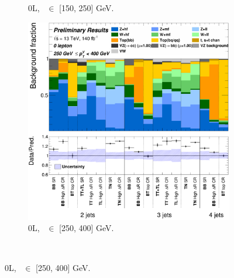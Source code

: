 \begin{figure}[h!]
{\begin{subfigure}[b]{0.38\textwidth}
            \caption{0L, \ptv\ $\in$ [150, 250] GeV.}
            \label{fig:backCom_0L_1}
        \end{subfigure}
        \begin{subfigure}[b]{0.38\textwidth}
            \centering
            \includegraphics[width=\textwidth]{Images/VH/Own_fit/backCom_uncPrefit/GlobalFit_unconditional__Prefit/C_SRCRs_L0_BMax400_BMin250.png}
            \caption{0L, \ptv\ $\in$ [250, 400] GeV.}
            \label{fig:backCom_0L_2}
        \end{subfigure} 
    }\\
\end{figure}
